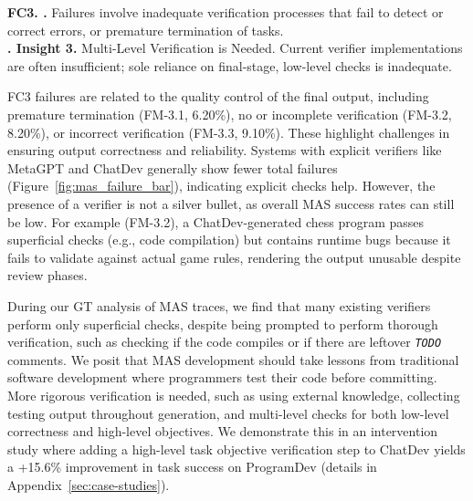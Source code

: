 \begin{tcolorbox}[colback=berkeleyblue!5!white, colframe=berkeleyblue!100!black, boxrule=0.5mm, left=0.1mm, right=0.1mm, top=0.1mm, bottom=0.1mm]
\textbf{FC3. \fcIII.} Failures involve inadequate verification processes that fail to detect or correct errors, or premature termination of tasks.
\\
\textbf{\faLightbulbO. Insight 3.} Multi-Level Verification is Needed. Current verifier implementations are often insufficient; sole reliance on final-stage, low-level checks is inadequate.
\end{tcolorbox}
FC3 failures are related to the quality control of the final output, including premature termination (FM-3.1, 6.20\%), no or incomplete verification (FM-3.2, 8.20\%), or incorrect verification (FM-3.3, 9.10\%). These highlight challenges in ensuring output correctness and reliability. Systems with explicit verifiers like MetaGPT and ChatDev generally show fewer total failures (Figure~\ref{fig:mas_failure_bar}), indicating explicit checks help. However, the presence of a verifier is not a silver bullet, as overall MAS success rates can still be low. For example (FM-3.2), a ChatDev-generated chess program passes superficial checks (e.g., code compilation) but contains runtime bugs because it fails to validate against actual game rules, rendering the output unusable despite review phases.

During our GT analysis of MAS traces, we find that many existing verifiers perform only superficial checks, despite being prompted to perform thorough verification, such as checking if the code compiles or if there are leftover \texttt{\textit{TODO}} comments. We posit that MAS development should take lessons from traditional software development where programmers test their code before committing.  More rigorous verification is needed, such as using external knowledge, collecting testing output throughout generation, and multi-level checks for both low-level correctness and high-level objectives. We demonstrate this in an intervention study where adding a high-level task objective verification step to ChatDev yields a +15.6\% improvement in task success on ProgramDev (details in Appendix~\ref{sec:case-studies}).

